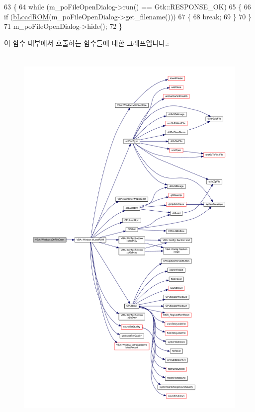 \begin{DoxyCode}
63 \{
64   \textcolor{keywordflow}{while} (m\_poFileOpenDialog->run() == Gtk::RESPONSE\_OK)
65   \{
66     \textcolor{keywordflow}{if} (\mbox{\hyperlink{class_v_b_a_1_1_window_a69ddb41bd29d9f0db04175671ff2e2f4}{bLoadROM}}(m\_poFileOpenDialog->get\_filename()))
67     \{
68       \textcolor{keywordflow}{break};
69     \}
70   \}
71   m\_poFileOpenDialog->hide();
72 \}
\end{DoxyCode}
이 함수 내부에서 호출하는 함수들에 대한 그래프입니다.\+:
\nopagebreak
\begin{figure}[H]
\begin{center}
\leavevmode
\includegraphics[height=550pt]{class_v_b_a_1_1_window_a8495a133642f2f0428d9487c86c8a231_cgraph}
\end{center}
\end{figure}
